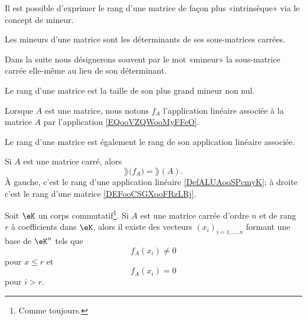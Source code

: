 Il est possible d'exprimer le rang d'une matrice de façon plus «intrinsèque» via le concept de mineur.
\begin{definition}
    Les mineurs d'une matrice sont les déterminants de ses sous-matrices carrées.
\end{definition}
Dans la suite nous désignerons souvent par le mot «mineur» la sous-matrice carrée elle-même au lieu de son déterminant.

\begin{proposition}      \label{DEFooVVBYooJbliTi}
    Le rang d'une matrice est la taille de son plus grand mineur non nul.
\end{proposition}

Lorsque \( A\) est une matrice, nous notons \( f_A\) l'application linéaire associée à la matrice \( A\) par l'application \eqref{EQooVZQWooMyFFeO}.

Le rang d'une matrice est également le rang de son application linéaire associée.
\begin{proposition}[Rang]       \label{PROPooCINLooFGNtwS}
    Si \( A\) est une matrice carré, alors
    \begin{equation}
        \rang\big( f_A \big)=\rang(A).
    \end{equation}
    À gauche, c'est le rang d'une application linéaire \ref{DefALUAooSPcmyK}; à droite c'est le rang d'une matrice \ref{DEFooCSGXooFRzLRj}.
\end{proposition}

\begin{lemma} \label{LEMVecsaRgFixe}
    Soit \( \eK \) un corps commutatif\footnote{Comme toujours.}. Si \( A \) est une matrice carrée d'ordre \( n \) et de rang \( r \) à coefficients dans \( \eK \), alors il existe des vecteurs \( (x_i)_{i=1,\dots,n} \) formant une base de \( \eK^n \) tels que 
    \begin{equation}
        f_A(x_i)\neq 0
    \end{equation}
    pour \( x\leq r\) et
    \begin{equation}
        f_A(x_i) = 0
    \end{equation}
    pour \( i > r \).
\end{lemma}

